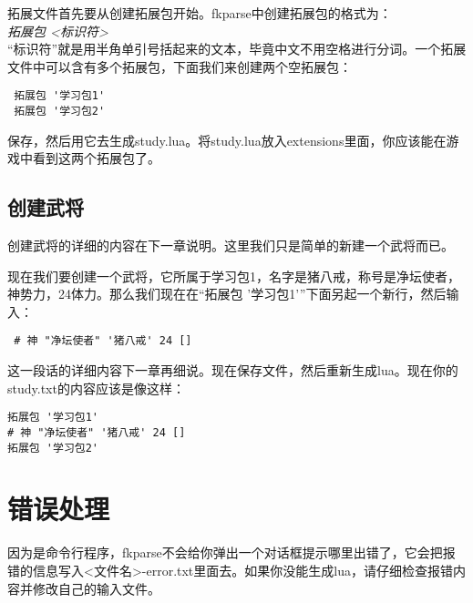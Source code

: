 拓展文件首先要从创建拓展包开始。fkparse中创建拓展包的格式为：\\

\emph{拓展包 <标识符>} \\

“标识符”就是用半角单引号括起来的文本，毕竟中文不用空格进行分词。一个拓展文件中可以含有多个拓展包，下面我们来创建两个空拓展包：

\begin{verbatim}
 拓展包 '学习包1'
 拓展包 '学习包2'
\end{verbatim}

保存，然后用它去生成study.lua。将study.lua放入extensions里面，你应该能在游戏中看到这两个拓展包了。

\subsection{创建武将}

创建武将的详细的内容在下一章说明。这里我们只是简单的新建一个武将而已。

现在我们要创建一个武将，它所属于学习包1，名字是猪八戒，称号是净坛使者，神势力，24体力。那么我们现在在“拓展包 '学习包1'”下面另起一个新行，然后输入：

\begin{verbatim}
 # 神 "净坛使者" '猪八戒' 24 []
\end{verbatim}

这一段话的详细内容下一章再细说。现在保存文件，然后重新生成lua。现在你的study.txt的内容应该是像这样：

\begin{verbatim}
拓展包 '学习包1'
# 神 "净坛使者" '猪八戒' 24 []
拓展包 '学习包2'
\end{verbatim}

\section{错误处理}

因为是命令行程序，fkparse不会给你弹出一个对话框提示哪里出错了，它会把报错的信息写入<文件名>-error.txt里面去。如果你没能生成lua，请仔细检查报错内容并修改自己的输入文件。
